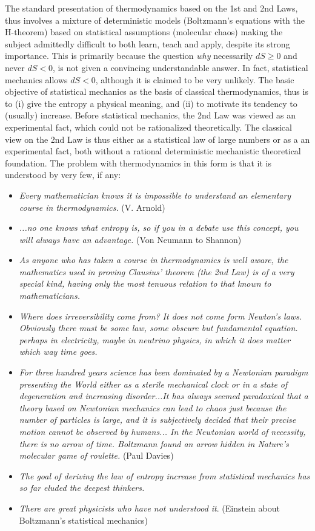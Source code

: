 The standard presentation of thermodynamics based on the 
1st and 2nd Laws, thus involves a mixture of deterministic 
models (Boltzmann's equations with the H-theorem) based on
statistical assumptions (molecular chaos) making the subject
admittedly difficult to both learn, teach and apply, 
despite its strong importance. This is primarily because the question \emph{why}
necessarily $dS\ge 0$ and never $dS<0$, is not
given a convincing understandable answer. 
In fact, statistical mechanics allows 
$dS<0$, although it is claimed to be very unlikely. The basic objective
of statistical mechanics as the basis of classical thermodynamics,
thus is to (i) give the entropy a physical meaning, and (ii) to motivate
its tendency to (usually) increase. Before statistical mechanics,
the 2nd Law was viewed as an experimental fact, which could not
be rationalized theoretically. The classical view on the 2nd Law
is thus either as a statistical law of large numbers or as a an 
experimental fact, both without a rational deterministic mechanistic 
theoretical foundation. The problem with thermodynamics in this form
is that it is understood by very few, if any:

\small
\begin{itemize}
\item \emph{Every mathematician knows it is impossible to understand
an elementary course in thermodynamics.} (V. Arnold)
\item \emph{...no one knows what entropy is, so if you in a debate use
this concept, you will always have an advantage.} (Von Neumann to Shannon)
\item \emph{As anyone who has taken a course in thermodynamics is well aware,
the mathematics used in proving Clausius' theorem (the 2nd Law) is of a very
special kind, having only the most tenuous relation to that known to
mathematicians.} \cite{brush}
\item \emph{Where does irreversibility come from? It does not come
form Newton's laws. Obviously there must be some law, some
obscure but fundamental equation. perhaps in electricity,
maybe in neutrino physics, in which it does
matter which way time goes.} \cite{feynman}
\item
\emph{For three hundred years science has been dominated by 
a Newtonian paradigm presenting the World either
as a sterile mechanical clock or in a state of degeneration 
and increasing disorder...It has always seemed paradoxical
that a theory based on Newtonian mechanics can lead
to chaos just because the number of particles is large, 
and it is subjectively decided that their precise motion cannot be 
observed by humans... In the Newtonian world of necessity, there
is no arrow of time. Boltzmann found an arrow hidden in  
Nature's molecular game of roulette.}
(Paul Davies)%
\item \emph{The goal of deriving the law of entropy increase
from statistical mechanics has so far eluded the deepest
thinkers.} \cite{lieb}
\item \emph{There are great physicists who have not understood it}.
(Einstein about Boltzmann's statistical mechanics) 
\end{itemize}
\normalsize
 
